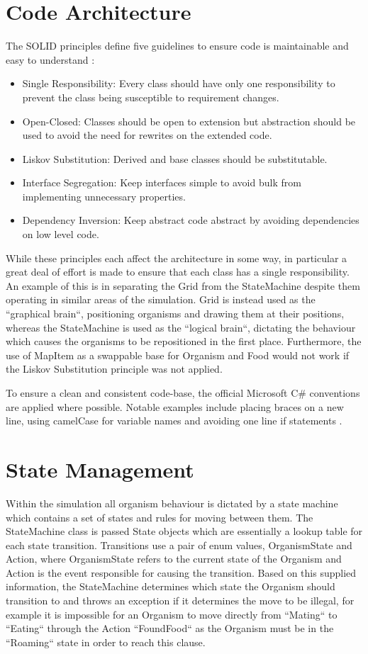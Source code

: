 \documentclass[a4paper, oneside, 11pt]{report}
\begin{document}
\section{Code Architecture}\label{architecture}
The SOLID principles define five guidelines to ensure code is maintainable and easy to understand \cite{kelmendi}: 
\begin{itemize}
	\item Single Responsibility: Every class should have only one responsibility to prevent the class being susceptible to requirement changes.
	\item Open-Closed: Classes should be open to extension but abstraction should be used to avoid the need for rewrites on the extended code.
	\item Liskov Substitution: Derived and base classes should be substitutable.
	\item Interface Segregation: Keep interfaces simple to avoid bulk from implementing unnecessary properties.
	\item Dependency Inversion: Keep abstract code abstract by avoiding dependencies on low level code.
\end{itemize}

While these principles each affect the architecture in some way, in particular a great deal of effort is made to ensure that each class has a single responsibility. An example of this is in separating the Grid from the StateMachine despite them operating in similar areas of the simulation. Grid is instead used as the ``graphical brain``, positioning organisms and drawing them at their positions, whereas the StateMachine is used as the ``logical brain``, dictating the behaviour which causes the organisms to be repositioned in the first place. Furthermore, the use of MapItem as a swappable base for Organism and Food would not work if the Liskov Substitution principle was not applied.

To ensure a clean and consistent code-base, the official Microsoft C\# conventions are applied where possible. Notable examples include placing braces on a new line, using camelCase for variable names and avoiding one line if statements \cite{microsoft}.

\section{State Management}\label{statemanagement}
Within the simulation all organism behaviour is dictated by a state machine which contains a set of states and rules for moving between them. The StateMachine class is passed State objects which are essentially a lookup table for each state transition. Transitions use a pair of enum values, OrganismState and Action, where OrganismState refers to the current state of the Organism and Action is the event responsible for causing the transition. Based on this supplied information, the StateMachine determines which state the Organism should transition to and throws an exception if it determines the move to be illegal, for example it is impossible for an Organism to move directly from ``Mating`` to ``Eating`` through the Action ``FoundFood`` as the Organism must be in the ``Roaming`` state in order to reach this clause.
\end{document}
